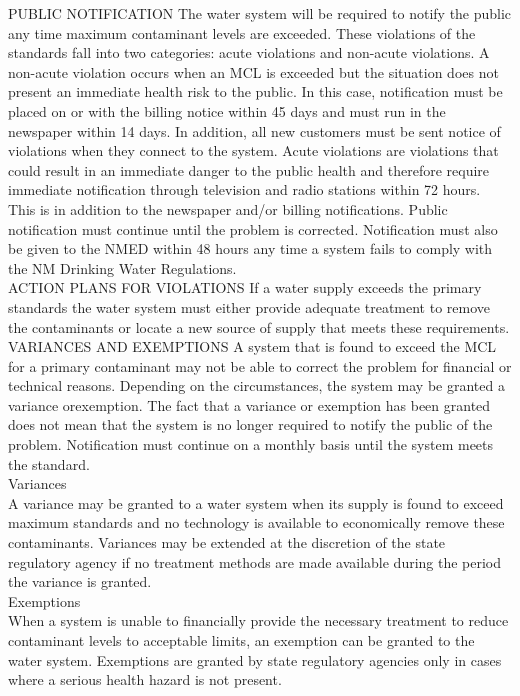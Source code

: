 PUBLIC NOTIFICATION The water system will be required to notify the public any time maximum contaminant levels are exceeded. These violations of the standards fall into two categories: acute violations and non-acute violations. A non-acute violation occurs when an MCL is exceeded but the situation does not present an immediate health risk to the public. In this case, notification must be placed on or with the billing notice within 45 days and must run in the newspaper within 14 days. In addition, all new customers must be sent notice of violations when they connect to the system. Acute violations are violations that could result in an immediate danger to the public health and therefore require immediate notification through television and radio stations within 72 hours. This is in addition to the newspaper and/or billing notifications. Public notification must continue until the problem is corrected. Notification must also be given to the NMED within 48 hours any time a system fails to comply with the NM Drinking Water Regulations.  \\
ACTION PLANS FOR VIOLATIONS If a water supply exceeds the primary standards the water system must either provide adequate treatment to remove the contaminants or locate a new source of supply that meets these requirements.  \\
VARIANCES AND EXEMPTIONS A system that is found to exceed the MCL for a primary contaminant may not be able to correct the problem for financial or technical reasons. Depending on the circumstances, the system may be granted a variance orexemption. The fact that a variance or exemption has been granted does not mean that the system is no longer required to notify the public of the problem. Notification must continue on a monthly basis until the system meets the standard. \\
Variances \\
A variance may be granted to a water system when its supply is found to exceed maximum standards and no technology is available to economically remove these contaminants. Variances may be extended at the discretion of the state regulatory agency if no treatment methods are made available during the period the variance is granted. \\
Exemptions \\
When a system is unable to financially provide the necessary treatment to reduce contaminant levels to acceptable limits, an exemption can be granted to the water system. Exemptions are granted by state regulatory agencies only in cases where a serious health hazard is not present. \\
